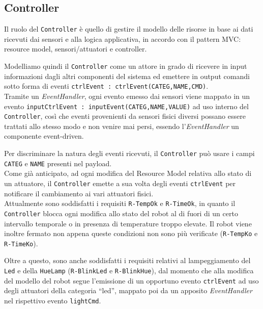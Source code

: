 \documentclass{../llncs}
\newcommand{\codescript}[1]{{\mbox{\small{\texttt{#1}}}}\xspace}
\newcommand{\code}[1]{{\color{blue}\small{\texttt{#1}}}}
\begin{document}
\subsection{Controller}
Il ruolo del \texttt{Controller} è quello di gestire il modello delle risorse in base ai dati ricevuti dai sensori e alla logica applicativa, in accordo con il pattern MVC: resource model, sensori/attuatori e controller.

Modelliamo quindi il \texttt{Controller} come un attore in grado di ricevere in input informazioni dagli altri componenti del sistema ed emettere in output comandi sotto forma di eventi \codescript{ctrlEvent : ctrlEvent(CATEG,NAME,CMD)}.\\



Tramite un \emph{EventHandler}, ogni evento emesso dai sensori viene mappato in un evento \codescript{inputCtrlEvent : inputEvent(CATEG,NAME,VALUE)} ad uso interno del \texttt{Controller}, così che eventi provenienti da sensori fisici diversi possano essere trattati allo stesso modo e non venire mai persi, %
essendo l'\emph{EventHandler} un componente event-driven.

Per discriminare la natura degli eventi ricevuti, il \texttt{Controller} può usare i campi \codescript{CATEG} e \codescript{NAME} presenti nel payload.\\

Come già anticipato, ad ogni modifica del Resource Model relativa allo stato di un attuatore, il \texttt{Controller} emette a sua volta degli eventi \codescript{ctrlEvent} per notificare il cambiamento ai vari attuatori fisici.\\



Attualmente sono soddisfatti i requisiti \code{R-TempOk} e \code{R-TimeOk}, in quanto il \texttt{Controller} blocca ogni modifica allo stato del robot al di fuori di un certo intervallo temporale o in presenza di temperature troppo elevate. Il robot viene inoltre fermato non appena queste condizioni non sono più verificate (\code{R-TempKo} e \code{R-TimeKo}).

Oltre a questo, sono anche soddisfatti i requisiti relativi al lampeggiamento del \texttt{Led} e della \texttt{HueLamp} (\code{R-BlinkLed} e \code{R-BlinkHue}), dal momento che alla modifica del modello del robot segue l'emissione di un opportuno evento \codescript{ctrlEvent} ad uso degli attuatori della categoria ``led'', mappato poi da un apposito \emph{EventHandler} nel rispettivo evento \codescript{lightCmd}.\\
\end{document}
